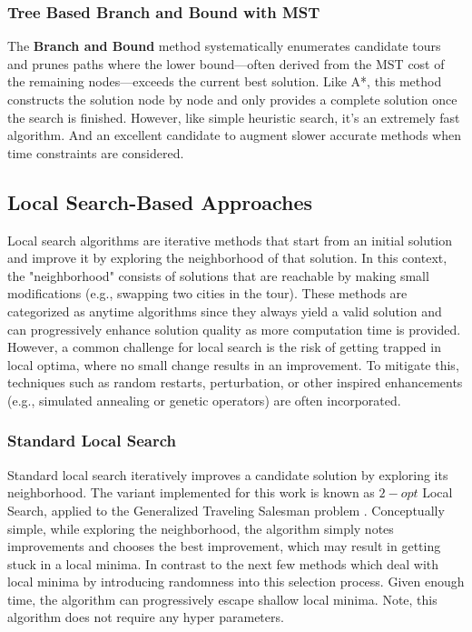 \documentclass[11pt]{article}
\begin{document}
	\subsubsection{Tree Based Branch and Bound with MST}
	The \textbf{Branch and Bound} method\cite{MORRISON201679} systematically enumerates candidate tours and prunes paths where the lower bound—often derived from the MST cost of the remaining nodes—exceeds the current best solution. Like A*, this method constructs the solution node by node and only provides a complete solution once the search is finished. However, like simple heuristic search, it's an extremely fast algorithm. And an excellent candidate to augment slower accurate methods when time constraints are considered.
	
	\subsection{Local Search-Based Approaches}
	Local search algorithms are iterative methods that start from an initial solution and improve it by exploring the neighborhood of that solution. In this context, the "neighborhood" consists of solutions that are reachable by making small modifications (e.g., swapping two cities in the tour). These methods are categorized as anytime algorithms since they always yield a valid solution and can progressively enhance solution quality as more computation time is provided. However, a common challenge for local search is the risk of getting trapped in local optima, where no small change results in an improvement. To mitigate this, techniques such as random restarts, perturbation, or other inspired enhancements (e.g., simulated annealing or genetic operators) are often incorporated.
	
	\subsubsection{Standard Local Search}
	Standard local search iteratively improves a candidate solution by exploring its neighborhood. The variant implemented for this work is known as $2-opt$ Local Search, applied to the Generalized Traveling Salesman problem \cite{DIMITRIJEVIC1997105}. Conceptually simple, while exploring the neighborhood, the algorithm simply notes improvements and chooses the best improvement, which may result in getting stuck in a local minima. In contrast to the next few methods which deal with local minima by introducing randomness into this selection process. Given enough time, the algorithm can progressively escape shallow local minima. Note, this algorithm does not require any hyper parameters.
	
\end{document}

